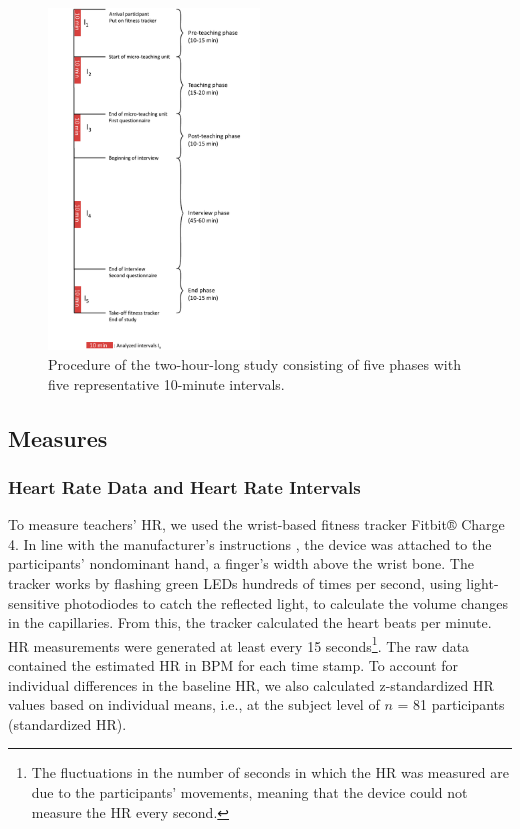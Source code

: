 \documentclass[preprint,
3p]{elsarticle} %
\begin{document}
\begin{figure}
  \centering
  \includegraphics[width=0.5\textwidth]{images/Timeline_smaller.pdf}
  \caption{Procedure of the two-hour-long study consisting of five phases with five representative 10-minute intervals.}
  \label{fig.2}
\end{figure}

\subsection{Measures}\label{measures}

\subsubsection{Heart Rate Data and Heart Rate
Intervals}\label{heart-rate-data-and-heart-rate-intervals}

To measure teachers' HR, we used the wrist-based fitness tracker Fitbit®
Charge 4. In line with the manufacturer's instructions \citep{fitbitnd},
the device was attached to the participants' nondominant hand, a
finger's width above the wrist bone. The tracker works by flashing green
LEDs hundreds of times per second, using light-sensitive photodiodes to
catch the reflected light, to calculate the volume changes in the
capillaries. From this, the tracker calculated the heart beats per
minute. HR measurements were generated at least every 15
seconds\footnote{The fluctuations in the number of seconds in which the
  HR was measured are due to the participants' movements, meaning that
  the device could not measure the HR every second.}. The raw data
contained the estimated HR in BPM for each time stamp. To account for
individual differences in the baseline HR, we also calculated
z-standardized HR values based on individual means, i.e., at the subject
level of \(n\) = 81 participants (standardized HR).
\end{document}
